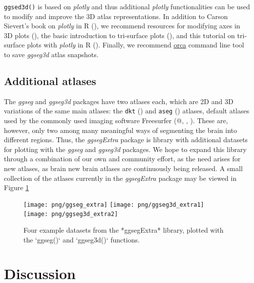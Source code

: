\documentclass[fleqn,10pt]{wlpeerj} %
\begin{document}
\texttt{ggsed3d()} is based on \emph{plotly} and thus additional \emph{plotly} functionalities can be used to modify and improve the 3D atlas representations.
In addition to Carson Sievert's book on \emph{plotly} in R (\citeyearpar{plotly}), we recommend resources for modifying axes in 3D plots (\citet{plotly-ax}), the basic introduction to tri-surface plots (\citet{plotly-tri}), and this tutorial on tri-surface plots with \emph{plotly} in R (\citet{plotly-trisurf}).
Finally, we recommend \href{https://github.com/plotly/orca\#installation}{orca} command line tool to save \emph{ggseg3d} atlas snapshots.

\hypertarget{additional-atlases}{%
\subsection{Additional atlases}\label{additional-atlases}}

The \emph{ggseg} and \emph{ggseg3d} packages have two atlases each, which are 2D and 3D variations of the same main atlases: the \texttt{dkt} (\citet{dkt}) and \texttt{aseg} (\citet{aseg}) atlases, default atlases used by the commonly used imaging software Freesurfer (@\citet{fischl_99}, \citet{dale_99}, \citet{Fischl2000}).
These are, however, only two among many meaningful ways of segmenting the brain into different regions.
Thus, the \emph{ggsegExtra} package is library with additional datasets for plotting with the \emph{ggseg} and \emph{ggseg3d} packages.
We hope to expand this library through a combination of our own and community effort, as the need arises for new atlases, as brain new brain atlases are continuously being released.
A small collection of the atlases currently in the \emph{ggsegExtra} package may be viewed in Figure \ref{fig:ggsegExtra}

\begin{figure}[H]
\texttt{[image: png/ggseg\_extra]} \texttt{[image: png/ggseg3d\_extra1]} \texttt{[image: png/ggseg3d\_extra2]} \caption{Four example datasets from the *ggsegExtra* library, plotted with the `ggseg()` and `ggseg3d()` functions.}\label{fig:ggsegExtra}
\end{figure}

\hypertarget{discussion}{%
\section{Discussion}\label{discussion}}
\end{document}
